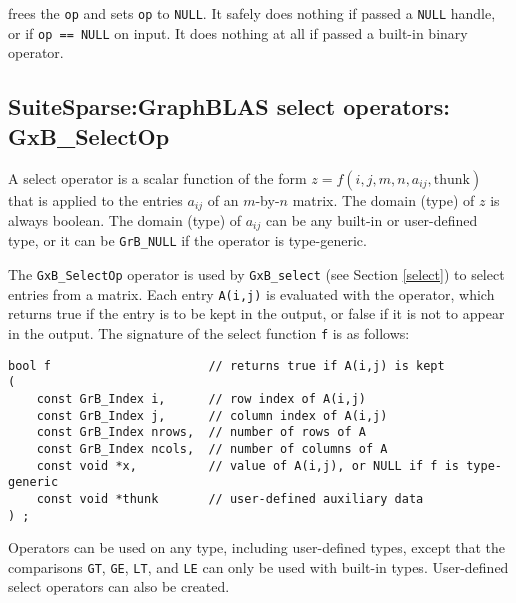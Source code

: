 \documentclass[12pt]{article}
\begin{document}
\noindent
frees the \verb'op' and sets \verb'op' to \verb'NULL'.
It safely does nothing if passed a \verb'NULL'
handle, or if \verb'op == NULL' on input.
It does nothing at all if passed a built-in binary operator.

\newpage
\subsection{SuiteSparse:GraphBLAS select operators: {\sf GxB\_SelectOp}} %
\label{selectop}

A select operator is a scalar function of the form
$z=f(i,j,m,n,a_{ij},\mbox{thunk})$ that is applied to the entries $a_{ij}$ of
an $m$-by-$n$ matrix.  The domain (type) of $z$ is always boolean.  The domain
(type) of $a_{ij}$ can be any built-in or user-defined type, or it can be
\verb'GrB_NULL' if the operator is type-generic.

The \verb'GxB_SelectOp' operator is used by \verb'GxB_select' (see Section
\ref{select}) to select entries from a matrix.  Each entry \verb'A(i,j)' is
evaluated with the operator, which returns true if the entry is to be kept in
the output, or false if it is not to appear in the output.  The signature of
the select function \verb'f' is as follows:

{\footnotesize
\begin{verbatim}
bool f                      // returns true if A(i,j) is kept
(
    const GrB_Index i,      // row index of A(i,j)
    const GrB_Index j,      // column index of A(i,j)
    const GrB_Index nrows,  // number of rows of A
    const GrB_Index ncols,  // number of columns of A
    const void *x,          // value of A(i,j), or NULL if f is type-generic
    const void *thunk       // user-defined auxiliary data
) ; \end{verbatim}}

Operators can be used on any type, including user-defined types, except that
the comparisons \verb'GT', \verb'GE', \verb'LT', and \verb'LE' can only be used
with built-in types.  User-defined select operators can also be created.
\end{document}
